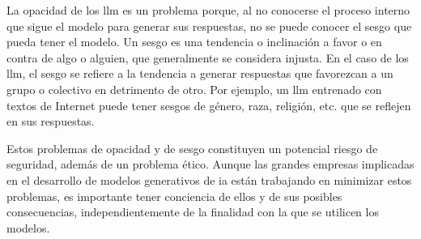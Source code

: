 La opacidad de los \gls{llm} es un problema porque, al no conocerse el proceso interno que sigue el modelo para generar sus respuestas, no se puede conocer el sesgo que pueda tener el modelo. Un sesgo es una tendencia o inclinación a favor o en contra de algo o alguien, que generalmente se considera injusta. En el caso de los \gls{llm}, el sesgo se refiere a la tendencia a generar respuestas que favorezcan a un grupo o colectivo en detrimento de otro. Por ejemplo, un \gls{llm} entrenado con textos de Internet puede tener sesgos de género, raza, religión, etc. que se reflejen en sus respuestas.

Estos problemas de opacidad y de sesgo constituyen un potencial riesgo de seguridad, además de un problema ético. Aunque las grandes empresas implicadas en el desarrollo de modelos generativos de \gls{ia} están trabajando en minimizar estos problemas, es importante tener conciencia de ellos y de sus posibles consecuencias, independientemente de la finalidad con la que se utilicen los modelos.